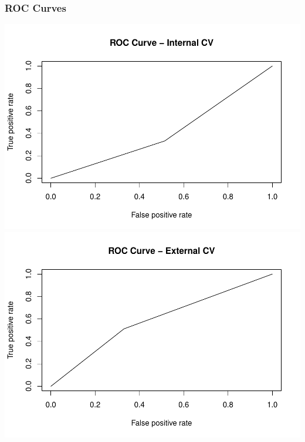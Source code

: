 \documentclass[american,]{article}
\begin{document}
\hypertarget{roc-curves}{%
\subsubsection{ROC Curves}\label{roc-curves}}

\includegraphics{Final_Project_Applied_files/figure-latex/ROC curves-1.pdf} \includegraphics{Final_Project_Applied_files/figure-latex/ROC curves-2.pdf}


\end{document}
